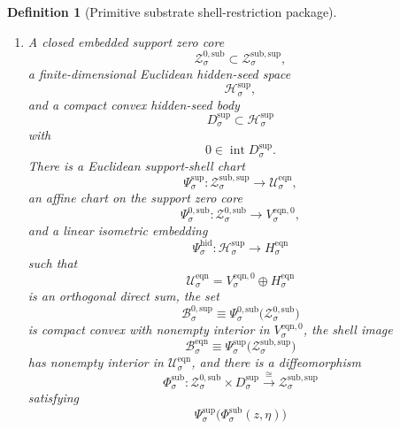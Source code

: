 \documentclass[11pt]{article}
\newcommand{\EqnSpace}[1]{\mathcal U_{#1}^{\mathrm{eqn}}}
\newcommand{\EqnBody}[1]{\mathcal B_{#1}^{\mathrm{eqn}}}
\newcommand{\EqnZero}[1]{V_{#1}^{\mathrm{eqn},0}}
\newcommand{\EqnHidden}[1]{H_{#1}^{\mathrm{eqn}}}
\newcommand{\ResSpace}[1]{\mathcal U_{#1}^{\mathrm{sup,res}}}
\newcommand{\ResBody}[1]{\mathcal B_{#1}^{\mathrm{sup,res}}}
\newcommand{\ResPair}[1]{\mathfrak m_{#1}^{\mathrm{sup,res}}}
\newcommand{\ResSection}[1]{\Theta_{#1}^{\mathrm{sup,res}}}
\newcommand{\ResData}[1]{\Lambda_{#1}^{\mathrm{sup,dat}}}
\newcommand{\ResShellMap}[1]{\Lambda_{#1}^{\mathrm{sup,sh}}}
\newcommand{\ResShellSet}[1]{\mathcal Z_{#1}^{\mathrm{sup,res}}}
\newcommand{\SeedHidden}[1]{\mathcal H_{#1}^{\mathrm{sup}}}
\newcommand{\SeedHiddenBody}[1]{D_{#1}^{\mathrm{sup}}}
\newcommand{\ZeroBody}[1]{\mathcal B_{#1}^{0,\mathrm{sup}}}
\newcommand{\SubChart}[1]{\Xi_{#1}^{\mathrm{sub}}}
\newcommand{\SubSupportShell}[1]{\mathcal Z_{#1}^{\mathrm{sub,sup}}}
\newcommand{\SubZeroCore}[1]{\mathcal Z_{#1}^{0,\mathrm{sub}}}
\newcommand{\ShellChart}[1]{\Psi_{#1}^{\mathrm{sup}}}
\newcommand{\SubZeroChart}[1]{\Psi_{#1}^{0,\mathrm{sub}}}
\newcommand{\HiddenChart}[1]{\Psi_{#1}^{\mathrm{hid}}}
\newcommand{\SubSplit}[1]{\Phi_{#1}^{\mathrm{sub}}}
\newtheorem{definition}{Definition}
\begin{document}
\begin{definition}[Primitive substrate shell-restriction package]
\begin{enumerate}
\begin{equation}
    \bigl(\ResSection{\sigma}\bigr)^{-1}(0)\cap\ResBody{\sigma}
    =
    \SubChart{\sigma}\bigl(\SubSupportShell{\sigma}\bigr).
    \label{eq:transportedsupportshell}
    \end{equation}
    Assume there exists \(\nu_{\sigma}^{\mathrm{sup}}>0\) such that
    \begin{equation}
    \ResPair{\sigma}\bigl(\ResSection{\sigma}(u),\ResSection{\sigma}(u)\bigr)
    \ge
    \nu_{\sigma}^{\mathrm{sup}}\,
    \operatorname{dist}\bigl(u,\ResShellSet{\sigma}\bigr)^{2}
    \qquad
    \text{for all }u\in\ResBody{\sigma}.
    \label{eq:transportednormal}
    \end{equation}
    The transported symmetry and time-reversal actions act linearly on \(\ResSpace{\sigma}\), preserving \(\ResBody{\sigma}\), \(\ResShellSet{\sigma}\), \(\ResSection{\sigma}\), \(\ResData{\sigma}\), and \(\ResShellMap{\sigma}\).
    \item A closed embedded support zero core
    \[
    \SubZeroCore{\sigma}\subset\SubSupportShell{\sigma},
    \]
    a finite-dimensional Euclidean hidden-seed space
    \[
    \SeedHidden{\sigma},
    \]
    and a compact convex hidden-seed body
    \[
    \SeedHiddenBody{\sigma}\subset\SeedHidden{\sigma}
    \]
    with
    \[
    0\in\operatorname{int}\SeedHiddenBody{\sigma}.
    \]
    There is a Euclidean support-shell chart
    \[
    \ShellChart{\sigma}:\SubSupportShell{\sigma}\to\EqnSpace{\sigma},
    \]
    an affine chart on the support zero core
    \[
    \SubZeroChart{\sigma}:\SubZeroCore{\sigma}\to\EqnZero{\sigma},
    \]
    and a linear isometric embedding
    \[
    \HiddenChart{\sigma}:\SeedHidden{\sigma}\to\EqnHidden{\sigma}
    \]
    such that
    \[
    \EqnSpace{\sigma}
    =
    \EqnZero{\sigma}\oplus\EqnHidden{\sigma}
    \]
    is an orthogonal direct sum, the set
    \[
    \ZeroBody{\sigma}
    \equiv
    \SubZeroChart{\sigma}\bigl(\SubZeroCore{\sigma}\bigr)
    \]
    is compact convex with nonempty interior in \(\EqnZero{\sigma}\), the shell image
    \[
    \EqnBody{\sigma}
    \equiv
    \ShellChart{\sigma}\bigl(\SubSupportShell{\sigma}\bigr)
    \]
    has nonempty interior in \(\EqnSpace{\sigma}\), and there is a diffeomorphism
    \begin{equation}
    \SubSplit{\sigma}:
    \SubZeroCore{\sigma}\times \SeedHiddenBody{\sigma}
    \xrightarrow{\cong}
    \SubSupportShell{\sigma}
    \label{eq:subsplit}
    \end{equation}
    satisfying
    \begin{equation}
    \ShellChart{\sigma}\bigl(\SubSplit{\sigma}(z,\eta)\bigr)

\end{equation}
\end{enumerate}
\end{definition}
\end{document}

